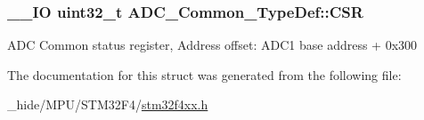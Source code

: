 \subsubsection[{C\+S\+R}]{\setlength{\rightskip}{0pt plus 5cm}\+\_\+\+\_\+\+I\+O uint32\+\_\+t A\+D\+C\+\_\+\+Common\+\_\+\+Type\+Def\+::\+C\+S\+R}\label{struct_a_d_c___common___type_def_ac38e24f600f9e134a54a0c43b976a4f4}
A\+D\+C Common status register, Address offset\+: A\+D\+C1 base address + 0x300 

The documentation for this struct was generated from the following file\+:\begin{DoxyCompactItemize}
\item 
\+\_\+hide/\+M\+P\+U/\+S\+T\+M32\+F4/\hyperlink{stm32f4xx_8h}{stm32f4xx.\+h}\end{DoxyCompactItemize}
